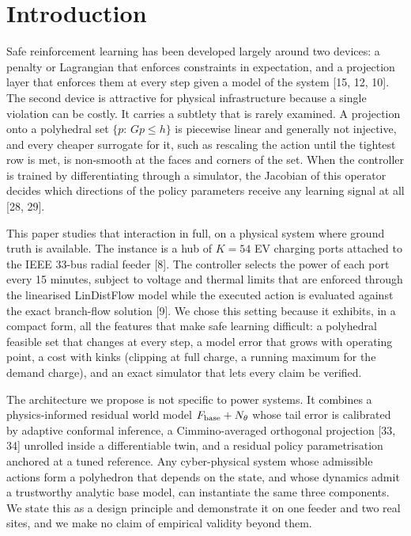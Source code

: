 \documentclass[11pt]{article}
\begin{document}
\section{Introduction}
Safe reinforcement learning has been developed largely around two devices: a penalty or Lagrangian that enforces constraints in expectation, and a projection layer that enforces them at every step given a model of the system [15, 12, 10]. The second device is attractive for physical infrastructure because a single violation can be costly. It carries a subtlety that is rarely examined. A projection onto a polyhedral set $\{p:\,Gp\le h\}$ is piecewise linear and generally not injective, and every cheaper surrogate for it, such as rescaling the action until the tightest row is met, is non-smooth at the faces and corners of the set. When the controller is trained by differentiating through a simulator, the Jacobian of this operator decides which directions of the policy parameters receive any learning signal at all [28, 29].

This paper studies that interaction in full, on a physical system where ground truth is available. The instance is a hub of $K=54$ EV charging ports attached to the IEEE 33-bus radial feeder [8]. The controller selects the power of each port every 15 minutes, subject to voltage and thermal limits that are enforced through the linearised LinDistFlow model while the executed action is evaluated against the exact branch-flow solution [9]. We chose this setting because it exhibits, in a compact form, all the features that make safe learning difficult: a polyhedral feasible set that changes at every step, a model error that grows with operating point, a cost with kinks (clipping at full charge, a running maximum for the demand charge), and an exact simulator that lets every claim be verified.

The architecture we propose is not specific to power systems. It combines a physics-informed residual world model $F_{\rm base}+N_\theta$ whose tail error is calibrated by adaptive conformal inference, a Cimmino-averaged orthogonal projection [33, 34] unrolled inside a differentiable twin, and a residual policy parametrisation anchored at a tuned reference. Any cyber-physical system whose admissible actions form a polyhedron that depends on the state, and whose dynamics admit a trustworthy analytic base model, can instantiate the same three components. We state this as a design principle and demonstrate it on one feeder and two real sites, and we make no claim of empirical validity beyond them.
\end{document}

